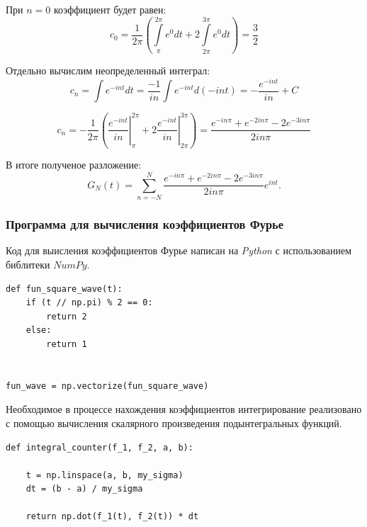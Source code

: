 \documentclass[a5paper, 10pt]{article}
\theoremstyle{definition}
\theoremstyle{plain}
\theoremstyle{remark}
\begin{document}
При $n=0$ коэффициент будет равен:
\begin{equation}
c_0 = \frac{1}{2 \pi} \left( \int \limits_{\pi}^{2 \pi} e^{0} dt + 2 \int \limits_{ 2 \pi}^{3 \pi} e^{0} dt \right) = \frac{3}{2}
\end{equation}

Отдельно вычислим неопределенный интеграл:
\begin{equation}
c_n = \int e^{-i n t} dt = \frac{-1}{in} \int e^{-i n t} d (-i n t) =  -\frac{e^{-i n t}}{in} + C
\end{equation}

\begin{equation}
c_n = -\frac{1}{2 \pi} \left(  \left. \frac{e^{-i n t}}{in} \right|_{\pi}^{2\pi} + 2  \left. \frac{e^{-i n t}}{in} \right|_{2\pi}^{3\pi} \right) =
 \frac{ e^{-i n \pi} + e^{-2i n \pi} - 2 e^{-3i n \pi}}{2 i n \pi}
\end{equation}


В итоге полученое разложение:
\begin{equation}
G_N (t) = \sum  \limits_{n=-N}^N   \frac{ e^{-i n \pi} + e^{-2i n \pi} - 2 e^{-3i n \pi}}{2 i n \pi} e^{i n t}.
\end{equation}


\subsubsection{Программа для вычисления коэффициентов Фурье}
Код для выисления коэффициентов Фурье написан на \textit{Python} с использованием библитеки $NumPy$.

\begin{center}
\begin{lstlisting}[label=some-code,caption={Функция, реализующая квадратную волну}]
def fun_square_wave(t):
    if (t // np.pi) % 2 == 0:
        return 2
    else:
        return 1


fun_wave = np.vectorize(fun_square_wave)
\end{lstlisting}
\end{center}

Необходимое в процессе нахождения коэффициентов интегрирование реализовано с помощью вычисления скалярного произведения подынтегральных функций.

\begin{center}
\begin{lstlisting}[label=some-code,caption={Функция, реализующая интегрирование для вычисления коэффициентов Фурье.}]
def integral_counter(f_1, f_2, a, b):

    t = np.linspace(a, b, my_sigma)
    dt = (b - a) / my_sigma

    return np.dot(f_1(t), f_2(t)) * dt
\end{lstlisting}
\end{center}
\end{document}
